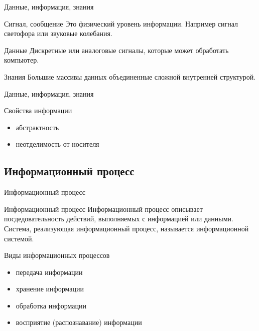 \begin{frame}{Данные, информация, знания}

\begin{block}{Сигнал, сообщение}
 Это физический уровень информации. Например сигнал светофора или звуковые колебания.
\end{block}
\pause
\begin{block}{Данные}
 Дискретные или аналоговые сигналы, которые может обработать компьютер.
\end{block}
\pause
\begin{block}{Знания}
 Большие массивы данных объединенные сложной внутренней структурой. 
\end{block}
\end{frame}

\begin{frame}{Данные, информация, знания}

\begin{block}{Свойства информации}
 \begin{itemize}
	 \item абстрактность
	 \item неотделимость от носителя
 \end{itemize}
 \end{block}

\end{frame}

 \subsection{Информационный процесс}
\begin{frame}{Информационный процесс}


\begin{block}{Информационный процесс}
 Информационный процесс описывает посдедовательность действий, выполняемых с информацией или данными.
 Система, реализующая информационный процесс, называется информационной системой.
 \end{block}
\begin{block}{Виды информационных процессов}
 \begin{itemize}
	 \item передача информации
	 \item хранение информации
	 \item обработка информации
	 \item восприятие (распознавание) информации
 \end{itemize}
 \end{block}
\end{frame}


